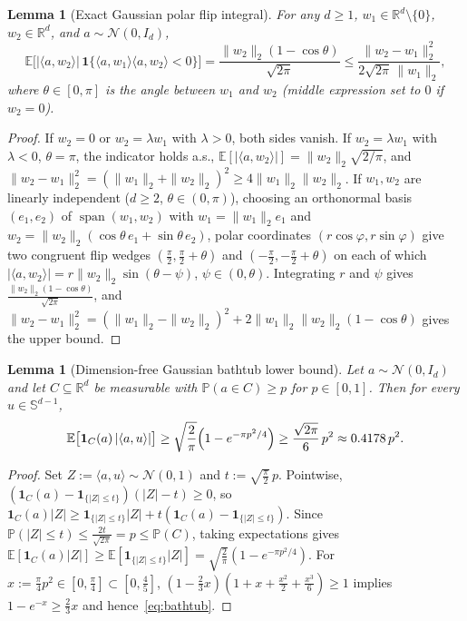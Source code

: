 \documentclass[11pt]{article}
\theoremstyle{plain}
\newtheorem{lemma}[theorem]{Lemma}
\theoremstyle{remark}
\numberwithin{equation}{section}
\newcommand{\R}{\mathbb{R}}
\newcommand{\E}{\mathbb{E}}
\newcommand{\Prob}{\mathbb{P}}
\newcommand{\Sph}{\mathbb{S}}
\newcommand{\ind}{\mathbf{1}}
\newcommand{\ip}[2]{\langle #1, #2 \rangle}
\newcommand{\norm}[1]{\|#1\|}
\begin{document}
\begin{lemma}[Exact Gaussian polar flip integral]
  \label{lem:polar-flip}
  For any $d \ge 1$, $w_1 \in \R^d \setminus \{0\}$, $w_2 \in \R^d$, and $a \sim \mathcal{N}(0, I_d)$,
  \[
    \E\bigl[|\ip{a}{w_2}|\,\ind\{\ip{a}{w_1}\ip{a}{w_2} < 0\}\bigr]
    = \frac{\norm{w_2}_2(1 - \cos\theta)}{\sqrt{2\pi}}
    \le \frac{\norm{w_2 - w_1}_2^2}{2\sqrt{2\pi}\,\norm{w_1}_2},
  \]
  where $\theta \in [0, \pi]$ is the angle between $w_1$ and $w_2$ (middle expression set to $0$ if $w_2 = 0$).
\end{lemma}
\begin{proof}
If $w_2 = 0$ or $w_2 = \lambda w_1$ with $\lambda > 0$, both sides vanish. If $w_2 = \lambda w_1$ with $\lambda < 0$, $\theta = \pi$, the indicator holds a.s., $\E[|\ip{a}{w_2}|] = \norm{w_2}_2\sqrt{2/\pi}$, and $\norm{w_2 - w_1}_2^2 = (\norm{w_1}_2 + \norm{w_2}_2)^2 \ge 4\norm{w_1}_2\norm{w_2}_2$. If $w_1, w_2$ are linearly independent ($d \ge 2$, $\theta \in (0, \pi)$), choosing an orthonormal basis $(e_1, e_2)$ of $\operatorname{span}(w_1, w_2)$ with $w_1 = \norm{w_1}_2 e_1$ and $w_2 = \norm{w_2}_2(\cos\theta\,e_1 + \sin\theta\,e_2)$, polar coordinates $(r\cos\varphi, r\sin\varphi)$ give two congruent flip wedges $(\frac{\pi}{2}, \frac{\pi}{2}+\theta)$ and $(-\frac{\pi}{2}, -\frac{\pi}{2}+\theta)$ on each of which $|\ip{a}{w_2}| = r\norm{w_2}_2\sin(\theta - \psi)$, $\psi \in (0, \theta)$. Integrating $r$ and $\psi$ gives $\frac{\norm{w_2}_2(1 - \cos\theta)}{\sqrt{2\pi}}$, and $\norm{w_2 - w_1}_2^2 = (\norm{w_1}_2 - \norm{w_2}_2)^2 + 2\norm{w_1}_2\norm{w_2}_2(1 - \cos\theta)$ gives the upper bound.
\end{proof}

\begin{lemma}[Dimension-free Gaussian bathtub lower bound]
  \label{lem:bathtub}
  Let $a \sim \mathcal{N}(0, I_d)$ and let $C \subseteq \R^d$ be measurable with $\Prob(a \in C) \ge p$ for $p \in [0, 1]$. Then for every $u \in \Sph^{d-1}$,
  \begin{equation}
    \label{eq:bathtub}
    \E\bigl[\ind_C(a)\,|\ip{a}{u}|\bigr]
    \ge \sqrt{\frac{2}{\pi}}\Bigl(1 - e^{-\pi p^2 / 4}\Bigr)
    \ge \frac{\sqrt{2\pi}}{6}\,p^2 \approx 0.4178\,p^2.
  \end{equation}
\end{lemma}
\begin{proof}
Set $Z := \ip{a}{u} \sim \mathcal{N}(0, 1)$ and $t := \sqrt{\frac{\pi}{2}}\,p$. Pointwise, $(\ind_C(a) - \ind_{\{|Z| \le t\}})(|Z| - t) \ge 0$, so $\ind_C(a)|Z| \ge \ind_{\{|Z| \le t\}}|Z| + t(\ind_C(a) - \ind_{\{|Z| \le t\}})$. Since $\Prob(|Z| \le t) \le \frac{2t}{\sqrt{2\pi}} = p \le \Prob(C)$, taking expectations gives $\E[\ind_C(a)|Z|] \ge \E[\ind_{\{|Z| \le t\}}|Z|] = \sqrt{\frac{2}{\pi}}(1 - e^{-\pi p^2/4})$. For $x := \frac{\pi}{4}p^2 \in [0, \frac{\pi}{4}] \subset [0, \frac{4}{5}]$, $(1 - \frac{2}{3}x)(1 + x + \frac{x^2}{2} + \frac{x^3}{6}) \ge 1$ implies $1 - e^{-x} \ge \frac{2}{3}x$ and hence~\eqref{eq:bathtub}.
\end{proof}
\end{document}
